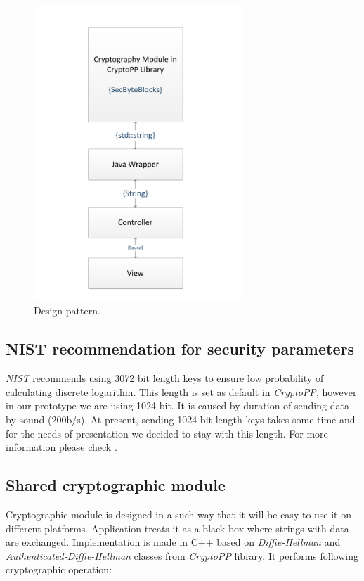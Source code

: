 \documentclass[11pt,titlepage]{article}
\theoremstyle{plain}
\begin{document}
\begin{figure}[H]
	\centering
	\includegraphics[width=0.7\textwidth]{img/MVC.pdf}
	\caption{Design pattern.}
\end{figure}

\subsection{NIST recommendation for security parameters}

\textit{NIST} recommends using 3072 bit length keys to ensure low probability of calculating discrete logarithm. This length is set as default in \textit{CryptoPP}, however in our prototype we are using 1024 bit. It is caused by duration of sending data by sound (200b/s). At present, sending 1024 bit length keys takes some time and for the needs of presentation we decided to stay with this length. For more information please check \cite{NIST}.

\subsection{Shared cryptographic module}
Cryptographic module is designed in a such way that it will be easy to use it on different platforms. Application treats it as a black box where strings with data are exchanged. Implementation is made in C++ based on \textit{Diffie-Hellman} and \textit{Authenticated-Diffie-Hellman} classes from \textit{CryptoPP} library. It performs following cryptographic operation:
\end{document}
